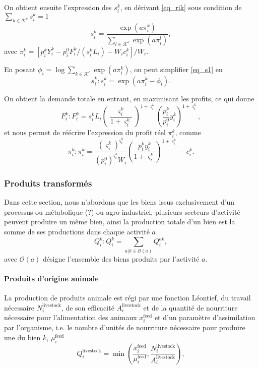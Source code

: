 On obtient ensuite l’expression des $s_i^k$, en dérivant \ref{eq_rik} sous condition de $\sum_{k\in \mathcal{K}^c} s_i^k = 1$
\begin{equation}\label{eq_s1}
	s_i^k = \frac{\exp(a \pi_i^k)}{\sum_{l \in \mathcal{K}^c} \exp(a \pi_i^l)},
\end{equation}
avec $\pi_i^k = [p_i^k Y_i^k - p_i^0 F_i^k/(s_i^k L_i) - W_i c_i^k]/W_i$.

En posant $\phi_i = \log \sum_{k \in \mathcal{K}^c} \exp(a \pi_i^k)$, on peut simplifier \ref{eq_s1} en
\begin{equation}\label{eq_sik}
	s_i^k: s_i^k = \exp(a \pi_i^k - \phi_i).
\end{equation}

On obtient la demande totale en entrant, en maximisant les profits, ce qui donne
\begin{equation}
	F_i^k: F_i^k = s_i^k L_i \left( \frac{\varsigma_i^k}{1+\varsigma_i^k} \right)^{1+\varsigma_i^k} \left( \frac{p_i^k}{p_i^0} y_i^k \right)^{1+\varsigma_i^k},
\end{equation}
et nous permet de réécrire l’expression du profit réel $\pi_i^k$, comme
\begin{equation}
	\pi_i^k : \pi_i^k = \frac{\left( \varsigma_i^k \right)^{\varsigma_i^k}}{\left(  p_i^0 \right)^{\varsigma_i^k}W_i} \left( \frac{p_i^k y_i^k}{1+\varsigma_i^k }\right)^{1+\varsigma_i^k} - c_i^k.
\end{equation}


\subsubsection{Produits transformés}
Dans cette section, nous n’abordons que les biens issus exclusivement d’un processus ou métabolique (?) ou agro-industriel, plusieurs secteurs d’activité peuvent produire un même bien, ainsi la production totale d’un bien est la somme de ses productions dans chaque activité $a$
\begin{equation}\label{eq_qik}
	Q_i^k: Q_i^k = \sum_{a|k\in \mathcal{O}(a)} Q_i^{ak},
\end{equation}
avec $\mathcal{O}(a)$ désigne l’ensemble des biens produits par l’activité $a$.

\paragraph{Produits d’origine animale} La production de produits animale est régi par une fonction Léontief, du travail nécessaire $N_i^\text{livestock}$, de son efficacité $A_i^\text{livestock}$ et de la quantité de nourriture nécessaire pour l’alimentation des animaux $x_i^\text{feed}$ et d’un paramètre d’assimilation par l’organisme, i.e. le nombre d’unités de nourriture nécessaire pour produire une du bien $k$, $\mu_i^\text{feed}$
\begin{equation}
	Q_i^{\text{livestock}} = \min \left(\frac{x^{\text{feed}}_i}{\mu^{\text{feed}}_i}, \frac{N_i^\text{livestock}}{A_i^\text{livestock}}\right),
\end{equation}

